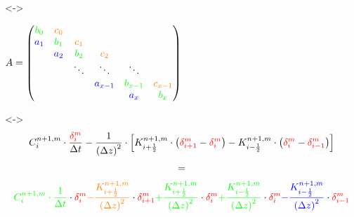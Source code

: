 \documentclass[xcolor=dvipsnames]{beamer}
\newcounter{firstElement}
\begin{document}
\begin{frame}[t]
  \only<\thefirstElement->{
    \centerline{
      \begin{math}
        A =
        \begin{pmatrix}
          \textcolor{green}{b_0} & \textcolor{orange}{c_0} & & & & \\
          \textcolor{blue}{a_1} & \textcolor{green}{b_1} & \textcolor{orange}{c_1} & & & \\
          & \textcolor{blue}{a_2} & \textcolor{green}{b_2} & \textcolor{orange}{c_2} & & \\
          & & \ddots & \ddots & \ddots & \\
          & & & \textcolor{blue}{a_{x-1}} & \textcolor{green}{b_{x-1}} & \textcolor{orange}{c_{x-1}} \\
          & & & & \textcolor{blue}{a_x} & \textcolor{green}{b_x}
        \end{pmatrix}
      \end{math}}}
  \only<\thefirstElement->{
    \begin{gather*}
      C_i^{n+1,m} \cdot \frac{\textcolor{red}{\delta_i^m}}{\Delta t} - \frac{1}{\left(\Delta z\right)^2} \cdot \left[K_{i+\frac{1}{2}}^{n+1,m} \cdot \left(\textcolor{red}{\delta_{i+1}^m} - \textcolor{red}{\delta_i^m}\right) - K_{i-\frac{1}{2}}^{n+1,m} \cdot \left(\textcolor{red}{\delta_i^m} - \textcolor{red}{\delta_{i-1}^m}\right)\right] \\[+1mm]
      = \\[+1mm]
      \textcolor{green}{C_i^{n+1,m} \cdot \frac{1}{\Delta t}} \cdot \textcolor{red}{\delta_i^m}
      \textcolor{orange}{ - \frac{K_{i+\frac{1}{2}}^{n+1,m}}{\left(\Delta z\right)^2}} \cdot \textcolor{red}{\delta_{i+1}^m}
      \textcolor{green}{ + \frac{K_{i+\frac{1}{2}}^{n+1,m}}{\left(\Delta z\right)^2}} \cdot \textcolor{red}{\delta_i^m}
      \textcolor{green}{ + \frac{K_{i-\frac{1}{2}}^{n+1,m}}{\left(\Delta z\right)^2}} \cdot \textcolor{red}{\delta_i^m}
      \textcolor{blue}{ - \frac{K_{i-\frac{1}{2}}^{n+1,m}}{\left(\Delta z\right)^2}} \cdot \textcolor{red}{\delta_{i-1}^m}
    \end{gather*}}
\end{frame}
\end{document}
